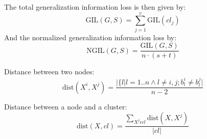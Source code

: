 \documentclass{llncs}
\providecommand{\abs}[1]{\lvert#1\rvert}
\begin{document}
The total generalization information loss is then given by:
\begin{equation*}
\text{GIL}(G,S) = \sum_{j=1}^{v} \text{GIL}(cl_j)
\end{equation*}
And the normalized generalization information loss by:
\begin{equation*}
\text{NGIL}(G,S) = \frac{\text{GIL}(G,S)}{n \cdot (s+t)}
\end{equation*}



Distance between two nodes:
\begin{equation*}
\text{dist}(X^i, X^j) = \frac{\abs{\{l|l=1..n \wedge l \ne i,j;b_l^i \ne b_l^j}}{n-2}
\end{equation*}

Distance between a node and a cluster:
\begin{equation*}
\text{dist}(X, cl) = \frac{\sum_{X^j \epsilon cl} \text{dist}(X, X^j) }{\abs{cl}}
\end{equation*}



\end{document}
